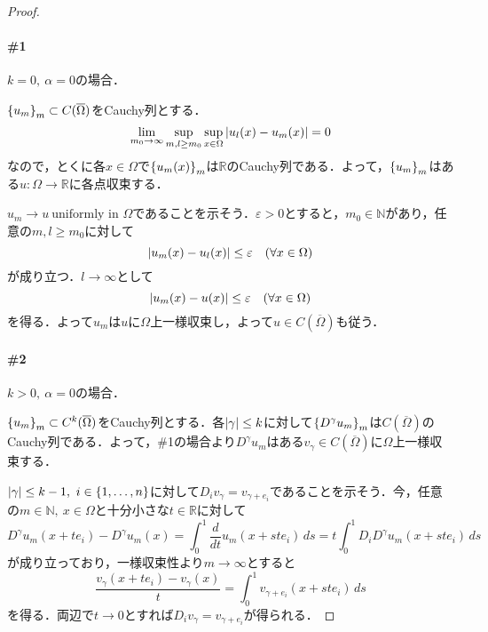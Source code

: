 \documentclass[a4paper]{ltjsarticle}
\newcommand{\Rset}{\mathbb{R}}
\newcommand{\Nset}{\mathbb{N}}
\newcommand{\Om}{\Omega}
\newcommand{\Ombar}{\overline{\Omega}}
\newcommand{\1}{\mathbbm{1}}
\numberwithin{equation}{section}
\theoremstyle{definition}
\begin{document}
\begin{proof}
    \paragraph*{\#1}$k=0,\ \alpha=0$の場合．

    $\qty{u_m}_{m}\subset C(\Ombar)$をCauchy列とする．
    \begin{equation}
        \lim_{m_0\to\infty}\sup_{m,l\geq m_0}\sup_{x\in\Om}\abs{u_l(x)-u_m(x)}=0
    \end{equation}
    なので，とくに各$x\in\Om$で$\qty{u_m(x)}_m$は$\Rset$のCauchy列である．よって，$\qty{u_m}_m$はある$u\colon \Om\to \Rset$に各点収束する．

    $u_m\to u\ \text{uniformly in $\Om$}$であることを示そう．$\varepsilon>0$とすると，$m_0\in\Nset$があり，任意の$m,l\geq m_0$に対して
    \begin{equation}
        \abs{u_m(x)-u_l(x)}\leq \varepsilon\quad (\forall x\in\Om)
    \end{equation}
    が成り立つ．$l\to\infty$として
    \begin{equation}
        \abs{u_m(x)-u(x)}\leq \varepsilon\quad (\forall x\in\Om )
    \end{equation}
    を得る．よって$u_m$は$u$に$\Om$上一様収束し，よって$u\in C(\Ombar)$も従う．

    \paragraph*{\#2}$k>0,\ \alpha=0$の場合．

    $\qty{u_m}_m\subset C^k(\Ombar)$をCauchy列とする．各$\abs{\gamma}\leq k$に対して$\qty{D^\gamma u_m}_{m}$は$C(\Ombar)$のCauchy列である．よって，\#1の場合より$D^\gamma u_m$はある$v_\gamma\in C(\Ombar)$に$\Om$上一様収束する．

    $\abs{\gamma}\leq k-1,\ i\in\qty{1,\ldots,n}$に対して$D_iv_\gamma=v_{\gamma+e_i}$であることを示そう．今，任意の$m\in\Nset,\ x\in\Om$と十分小さな$t\in\Rset$に対して
    \begin{equation}
        D^\gamma u_m(x+te_i)-D^\gamma u_m(x)=\int_0^1 \frac{d}{dt}u_m(x+ste_i)\,ds=t\int_{0}^1 D_iD^\gamma u_m(x+ste_i)\,ds
    \end{equation}
    が成り立っており，一様収束性より$m\to\infty$とすると
    \begin{equation}
        \frac{v_{\gamma}(x+te_i)-v_\gamma(x)}{t}=\int_0^1 v_{\gamma+e_i}(x+ste_i)\,ds 
    \end{equation}
    を得る．両辺で$t\to0$とすれば$D_iv_\gamma=v_{\gamma+e_i}$が得られる．


\end{proof}
\end{document}
